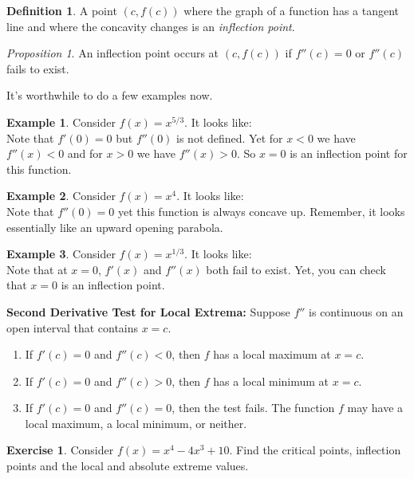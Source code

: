 \documentclass[leqno]{article}
\theoremstyle{definition}
\newtheorem{definition}{Definition}[section]
\newtheorem{example}{Example}[section]
\newtheorem{exercise}{Exercise}[section]
\theoremstyle{remark}
\theoremstyle{theorem}
\newtheorem{proposition}{Proposition}[section]
\begin{document}
\begin{definition}
A point $(c,f(c))$ where the graph of a function has a tangent line and where the concavity changes is an \emph{inflection point}.
\end{definition}

\begin{proposition}
An inflection point occurs at $(c,f(c))$ if $f''(c)=0$ or $f''(c)$ fails to exist.
\end{proposition}

It's worthwhile to do a few examples now.  

\begin{example}
Consider $f(x)=x^{5/3}$. It looks like:
\vspace*{4cm}\\
Note that $f'(0)=0$ but $f''(0)$ is not defined.  Yet for $x<0$ we have $f''(x)<0$ and for $x>0$ we have $f''(x)>0$.  So $x=0$ is an inflection point for this function.
\end{example}

\begin{example}
Consider $f(x)=x^4$.  It looks like:
\vspace*{4cm}\\
Note that $f''(0)=0$ yet this function is always concave up.  Remember, it looks essentially like an upward opening parabola.
\end{example}

\begin{example}
Consider $f(x)=x^{1/3}$. It looks like:
\vspace*{4cm}\\
Note that at $x=0$, $f'(x)$ and $f''(x)$ both fail to exist.  Yet, you can check that $x=0$ is an inflection point.
\end{example}

\noindent \textbf{Second Derivative Test for Local Extrema:} Suppose $f''$ is continuous on an open interval that contains $x=c$. 
\begin{enumerate}[1.]
\item If $f'(c)=0$ and $f''(c)<0$, then $f$ has a local maximum at $x=c$.
\item If $f'(c)=0$ and $f''(c)>0$, then $f$ has a local minimum at $x=c$.
\item If $f'(c)=0$ and $f''(c)=0$, then the test fails. The function $f$ may have a local maximum, a local minimum, or neither.
\end{enumerate}

\begin{exercise}
Consider $f(x)=x^4-4x^3+10$.  Find the critical points, inflection points and the local and absolute extreme values.
\vspace*{10cm}\\
\end{exercise}
\end{document}
